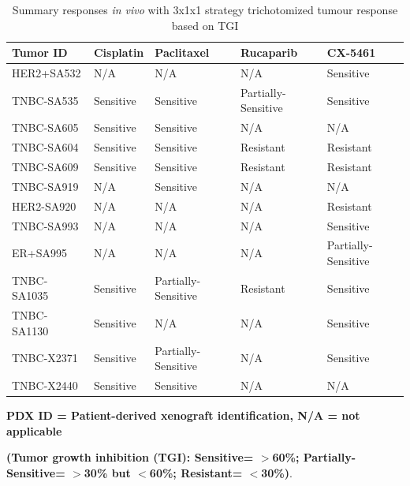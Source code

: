 \begin{table}[htbp]
  \centering
  \caption{Summary responses \textit{in vivo} with 3x1x1 strategy trichotomized tumour response based on TGI \cite{hather2014growth, aykan2020objective}}
    \begin{tabular}{|l|l|l|l|l|}
    
     \hline
    \textbf{Tumor ID} & \textbf{Cisplatin} & \textbf{Paclitaxel} & \textbf{Rucaparib} & \textbf{CX-5461} \\
     \hline
    HER2+SA532 & N/A   & N/A   & N/A   & Sensitive \\
    TNBC-SA535 & Sensitive & Sensitive & Partially-Sensitive & Sensitive \\
    TNBC-SA605 & Sensitive & Sensitive & N/A   & N/A \\
    TNBC-SA604 & Sensitive & Sensitive & Resistant & Resistant \\
    TNBC-SA609 & Sensitive & Sensitive & Resistant & Resistant \\
    TNBC-SA919 & N/A   & Sensitive & N/A   & N/A \\
    HER2-SA920 & N/A   & N/A   & N/A   & Resistant \\
    TNBC-SA993 & N/A   & N/A   & N/A   & Sensitive \\
    ER+SA995 & N/A   & N/A   & N/A   & Partially-Sensitive \\
    TNBC-SA1035 & Sensitive & Partially-Sensitive & Resistant & Sensitive \\
    TNBC-SA1130 & Sensitive & N/A   & N/A   & Sensitive \\
    TNBC-X2371 & Sensitive & Partially-Sensitive & N/A   & Sensitive \\
    TNBC-X2440 & Sensitive & Sensitive & N/A   & N/A \\
     \hline
    \end{tabular}%

\small\textbf{PDX ID = Patient-derived xenograft identification, N/A = not applicable}\\
  \label{tab:PDXtumorsinvivo}%


   \small\textbf{ (Tumor growth inhibition (TGI): Sensitive= $>$60\%; Partially-Sensitive= $>$30\% but $<$60\%; Resistant= $<$30\%)}.
\end{table}%





